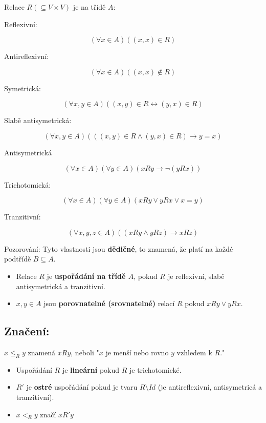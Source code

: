 \begin{definice}
	Relace $R (\subseteq V \times V)$ je na třídě $A$:
	
	Reflexivní:
	
	$$
	(\forall x \in A)((x,x) \in R)
	$$
	
	Antireflexivní:
	
	$$
	(\forall x \in A)((x,x) \notin R)
	$$
	
	Symetrická:
	
	$$
	(\forall x, y \in A)((x,y) \in R \leftrightarrow (y,x) \in R)
	$$
	
	Slabě antisymetrická:
	
	$$
	(\forall x, y \in A)(((x,y) \in R \land (y,x) \in R) \rightarrow y = x)
	$$
	
	Antisymetrická
	
	$$
	(\forall x \in A)(\forall y \in A)(x R y \rightarrow \neg (y R x))
	$$
	
	Trichotomická:
	
	$$
	(\forall x \in A)( \forall y \in A)(xRy \lor yRx \lor x = y)
	$$
	
	Tranzitivní:
	
	$$
	(\forall x,y,z \in A)((xRy \land yRz) \rightarrow xRz)
	$$
\end{definice}

Pozorování: Tyto vlastnosti jsou \textbf{dědičné}, to znamená, že platí na každé podtřídě $B \subseteq A$.

\begin{definice}
	\begin{itemize}
		\item Relace $R$ je \textbf{uspořádání na třídě $A$}, pokud $R$ je reflexivní, slabě antisymetrická a tranzitivní.
		\item $x,y \in A$ jsou \textbf{porovnatelné (srovnatelné)} relací $R$ pokud $xRy \lor yRx$.
	\end{itemize}
\end{definice}

\subsection{Značení:}

$x \leq_{R} y$ znamená $xRy$, neboli "$x$ je menší nebo rovno $y$ vzhledem k $R$."

\begin{definice}
	\begin{itemize}
		\item Uspořádání $R$ je \textbf{lineární} pokud $R$ je trichotomické.
		\item $R'$ je \textbf{ostré} uspořádání pokud je tvaru $R \setminus Id$ (je antireflexivní, antisymetricá a tranzitivní).
		\item $x <_{R} y$ značí $x R' y$
	\end{itemize}
\end{definice}

